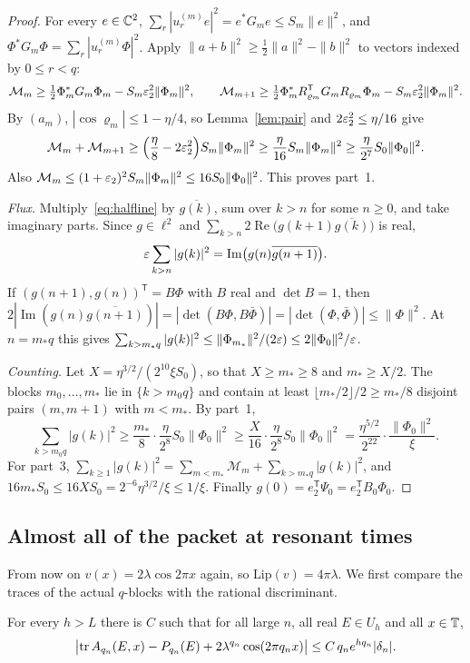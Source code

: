 \begin{proof}
For every $e\in\mathbb C^2$, $\sum_r|u_r^{(m)}e|^2=e^*G_me\le S_m\|e\|^2$, and $\Phi^*G_m\Phi=\sum_r|u_r^{(m)}\Phi|^2$. Apply $\|a+b\|^2\ge\frac12\|a\|^2-\|b\|^2$ to vectors indexed by $0\le r<q$:
\[
\mathcal M_m\ge\tfrac12\Phi_m^*G_m\Phi_m-S_m\varepsilon_2^2\|\Phi_m\|^2,\qquad
\mathcal M_{m+1}\ge\tfrac12\Phi_m^*R_{\varrho_m}^{\mathsf T}G_mR_{\varrho_m}\Phi_m-S_m\varepsilon_2^2\|\Phi_m\|^2 .
\]
By $(a_m)$, $|\cos\varrho_m|\le1-\eta/4$, so Lemma~\ref{lem:pair} and $2\varepsilon_2^2\le\eta/16$ give
\[
\mathcal M_m+\mathcal M_{m+1}\ge\Bigl(\frac\eta8-2\varepsilon_2^2\Bigr)S_m\|\Phi_m\|^2\ge\frac\eta{16}S_m\|\Phi_m\|^2\ge\frac{\eta}{2^7}S_0\|\Phi_0\|^2 .
\]
Also $\mathcal M_m\le(1+\varepsilon_2)^2S_m\|\Phi_m\|^2\le16S_0\|\Phi_0\|^2$. This proves part~1.

\emph{Flux.} Multiply~\eqref{eq:halfline} by $\overline{g(k)}$, sum over $k>n$ for some $n\ge0$, and take imaginary parts. Since $g\in\ell^2$ and $\sum_{k>n}2\operatorname{Re}\bigl(g(k+1)\overline{g(k)}\bigr)$ is real,
\[
\varepsilon\sum_{k>n}|g(k)|^2=\operatorname{Im}\bigl(g(n)\overline{g(n+1)}\bigr).
\]
If $(g(n+1),g(n))^{\mathsf T}=B\Phi$ with $B$ real and $\det B=1$, then $2|\operatorname{Im}(g(n)\overline{g(n+1)})|=|\det(B\Phi,B\bar\Phi)|=|\det(\Phi,\bar\Phi)|\le\|\Phi\|^2$. At $n=m_*q$ this gives $\sum_{k>m_*q}|g(k)|^2\le\|\Phi_{m_*}\|^2/(2\varepsilon)\le2\|\Phi_0\|^2/\varepsilon$.

\emph{Counting.} Let $X=\eta^{3/2}/(2^{10}\xi S_0)$, so that $X\ge m_*\ge8$ and $m_*\ge X/2$. The blocks $m_0,\dots,m_*$ lie in $\{k>m_0q\}$ and contain at least $\lfloor m_*/2\rfloor/2\ge m_*/8$ disjoint pairs $(m,m+1)$ with $m<m_*$. By part~1,
\[
\sum_{k>m_0q}|g(k)|^2\ge\frac{m_*}8\cdot\frac{\eta}{2^8}S_0\|\Phi_0\|^2\ge\frac{X}{16}\cdot\frac{\eta}{2^8}S_0\|\Phi_0\|^2=\frac{\eta^{5/2}}{2^{22}}\cdot\frac{\|\Phi_0\|^2}{\xi}.
\]
For part~3, $\sum_{k\ge1}|g(k)|^2=\sum_{m<m_*}\mathcal M_m+\sum_{k>m_*q}|g(k)|^2$, and $16m_*S_0\le16XS_0=2^{-6}\eta^{3/2}/\xi\le1/\xi$. Finally $g(0)=e_2^{\mathsf T}\Psi_0=e_2^{\mathsf T}B_0\Phi_0$.
\end{proof}

\subsection{Almost all of the packet at resonant times}

From now on $v(x)=2\lambda\cos2\pi x$ again, so $\mathrm{Lip}(v)=4\pi\lambda$. We first compare the traces of the actual $q$-blocks with the rational discriminant.

\begin{lemma}\label{lem:blocktrace}
For every $h>L$ there is $C$ such that for all large $n$, all real $E\in U_h$ and all $x\in\mathbb T$,
\[
\bigl|\operatorname{tr} A_{q_n}(E,x)-P_{q_n}(E)+2\lambda^{q_n}\cos(2\pi q_nx)\bigr|\le C\,q_ne^{hq_n}|\delta_n| .
\]
\end{lemma}

